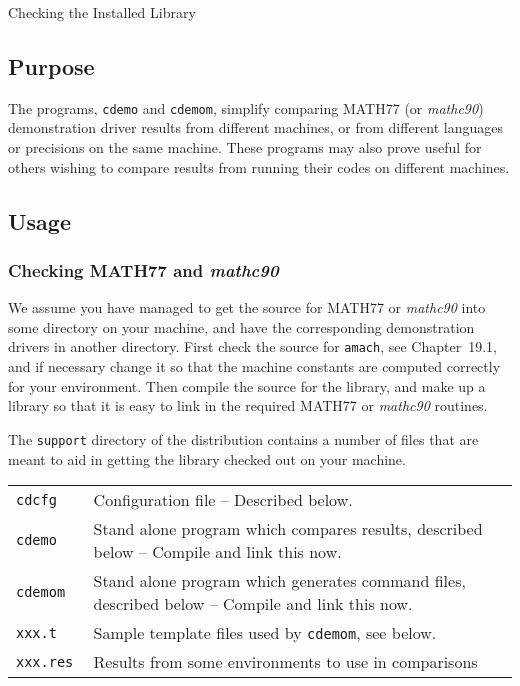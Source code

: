 \documentclass[twoside]{MATH77}
\begin{document}
 Checking the Installed Library


\subsection{Purpose}

The programs, {\tt cdemo} and {\tt cdemom}, simplify comparing MATH77 (or
{\em mathc90}) demonstration driver results from different machines, or
from different languages or precisions on the same machine.  These
programs may also prove useful for others wishing to compare results
from running their codes on different machines.

\subsection{Usage}
\subsubsection{Checking MATH77 and {\em mathc90}}
We assume you have managed to get the source for MATH77 or {\em mathc90}
into some directory on your machine, and have the corresponding demonstration
drivers in another directory.  First check the source for {\tt amach},
see Chapter~19.1, and if necessary change it so that the machine constants
are computed correctly for your environment.  Then compile the source for
the library, and make up a library so that it is easy to link in the
required MATH77 or {\em mathc90} routines.

The {\tt support} directory of the distribution contains a number of files
that are meant to aid in getting the library checked out on your machine.

\begin{tabular}{lp{2.5in}}
\tt cdcfg & Configuration file -- Described below.\\
\tt cdemo & Stand alone program which compares results, described below
-- Compile and link this now.\\
\tt cdemom & Stand alone program which generates command files, described
below -- Compile and link this now.\\
\tt xxx.t & Sample template files used by {\tt cdemom}, see below.\\
\tt xxx.res & Results from some environments to use in comparisons
\end{tabular}
\end{document}
